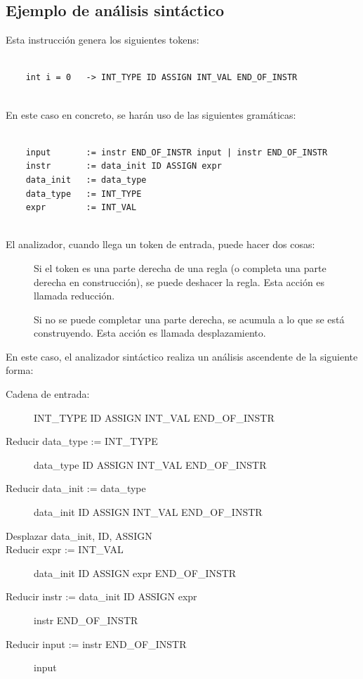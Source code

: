 \documentclass[11pt, english]{article}
\begin{document}
	
	\subsection{Ejemplo de análisis sintáctico}
	
	Esta instrucción genera los siguientes tokens:
	
	\begin{lstlisting}
	
	int i = 0	-> INT_TYPE ID ASSIGN INT_VAL END_OF_INSTR
	
	\end{lstlisting}
	
	En este caso en concreto, se harán uso de las siguientes gramáticas:
	
	\begin{lstlisting}
	
	input 		:= instr END_OF_INSTR input | instr END_OF_INSTR
	instr 		:= data_init ID ASSIGN expr
	data_init 	:= data_type
	data_type	:= INT_TYPE
	expr 		:= INT_VAL
	
	\end{lstlisting}
	
	El analizador, cuando llega un token de entrada, puede hacer dos cosas:
	
	\begin{description}
		\item[] Si el token es una parte derecha de una regla (o completa una parte derecha en construcción), se puede  deshacer la regla. Esta acción es llamada reducción.\newline
		\newline\newline
		\item[] Si no se puede completar una parte derecha, se acumula a lo que se está construyendo. Esta acción es llamada desplazamiento.
	\end{description}

	En este caso, el analizador sintáctico realiza un análisis ascendente de la siguiente forma:
	
	\begin{description}
		
		\item[Cadena de entrada:] INT\_TYPE ID ASSIGN INT\_VAL END\_OF\_INSTR
		\item[Reducir data\_type := INT\_TYPE] data\_type ID ASSIGN INT\_VAL END\_OF\_INSTR
		\item[Reducir data\_init := data\_type] data\_init ID ASSIGN INT\_VAL END\_OF\_INSTR
		\item[Desplazar data\_init, ID, ASSIGN]
		\item[Reducir expr := INT\_VAL] data\_init ID ASSIGN expr END\_OF\_INSTR
		\item[Reducir instr := data\_init ID ASSIGN expr] instr END\_OF\_INSTR
		\item[Reducir input := instr END\_OF\_INSTR] input
		
	\end{description}
	
\end{document}

